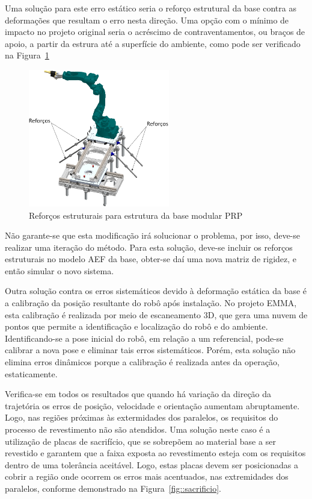 Uma solução para este erro estático seria o reforço estrutural da base contra as
deformações que resultam o erro nesta direção. Uma opção com o mínimo de impacto
no projeto original seria o acréscimo de contraventamentos, ou braços de apoio,
a partir da estrura até a superfície do ambiente, como pode ser verificado na
Figura~\ref{fig::contraventamentos}

\begin{figure}[h!]
	\centering 
 	\includegraphics[width=0.55\textwidth]{figs/contraventamentos}
 	\caption{Reforços estruturais para estrutura da base modular PRP}
 	\label{fig::contraventamentos}
\end{figure}

Não garante-se que esta modificação irá solucionar o problema, por isso, deve-se
realizar uma iteração do método. Para esta solução, deve-se incluir os reforços
estruturais no modelo AEF da base, obter-se daí uma nova matriz de rigidez, e
então simular o novo sistema.

Outra solução contra os erros sistemáticos devido à deformação estática da base
é a calibração da posição resultante do robô após instalação. No projeto EMMA,
esta calibração é realizada por meio de escaneamento 3D, que gera uma nuvem de
pontos que permite a identificação e localização do robô e do ambiente.
Identificando-se a pose inicial do robô, em relação a um referencial, pode-se
calibrar a nova pose e eliminar tais erros sistemáticos. Porém, esta solução não
elimina erros dinâmicos porque a calibração é realizada antes da operação,
estaticamente.

Verifica-se em todos os resultados que quando há variação da direção da
trajetória os erros de posição, velocidade e orientação aumentam abruptamente.
Logo, nas regiões próximas às extermidades dos paralelos, os requisitos do
processo de revestimento não são atendidos. Uma solução neste caso é a
utilização de placas de sacrifício, que se sobrepõem ao material base a ser
revestido e garantem que a faixa exposta ao revestimento esteja com os
requisitos dentro de uma tolerância aceitável. Logo, estas placas devem ser
posicionadas a cobrir a região onde ocorrem os erros mais acentuados, nas
extremidades dos paralelos, conforme demonstrado na
Figura~\ref{fig::sacrificio}.

